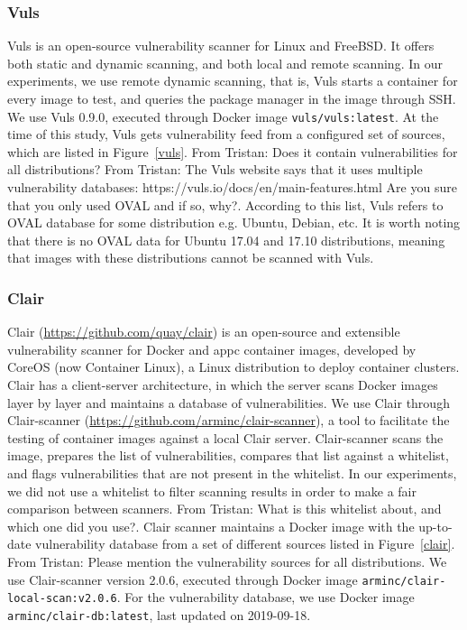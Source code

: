 \documentclass[a4paper,num-refs]{oup-contemporary}
\newcommand{\tristan}[1]{\color{blue}From Tristan: #1\color{black}}
\begin{document}
\subsubsection{Vuls}

Vuls is an open-source vulnerability scanner for Linux and FreeBSD. It
offers both static and dynamic scanning, and both local and remote
scanning. In our experiments, we use remote dynamic scanning, that is, Vuls
starts a container for every image to test, and queries the package manager
in the image through SSH. We use Vuls 0.9.0, executed through Docker image
\texttt{vuls/vuls:latest}. At the time of this study, Vuls gets vulnerability feed
from a configured set of sources, which are listed in Figure~\ref{vuls}.
\tristan{Does it contain
vulnerabilities for all distributions?} 
\tristan{The Vuls website says that it uses multiple vulnerability databases: https://vuls.io/docs/en/main-features.html Are you sure 
that you only used OVAL and if so, why?}. According to this list, Vuls
refers to OVAL database for some distribution e.g. Ubuntu, Debian, etc.
It is worth noting that there is
no OVAL data for Ubuntu 17.04 and 17.10 distributions, meaning that images
with these distributions cannot be scanned with Vuls.

\subsubsection{Clair}

Clair (\url{https://github.com/quay/clair}) is an open-source and extensible
vulnerability scanner for Docker and appc container images, developed by
CoreOS (now Container Linux), a Linux distribution to deploy container
clusters. Clair has a client-server architecture, in which the server
scans Docker images layer by layer and maintains a database of vulnerabilities. We use Clair through Clair-scanner
(\url{https://github.com/arminc/clair-scanner}), a tool to facilitate the testing
of container images against a local Clair server. Clair-scanner scans the image,
prepares the list of vulnerabilities, compares that list against a
whitelist, and flags vulnerabilities that are not present in the whitelist.
In our experiments, we did not use a whitelist to filter scanning results in
order to make a fair comparison between scanners.
\tristan{What is this whitelist about, and which one did you use?}. Clair
scanner maintains a Docker image with the up-to-date vulnerability
database from a set of different sources listed in Figure~\ref{clair}.  \tristan{Please mention the vulnerability sources for all distributions}.
 We use Clair-scanner version 2.0.6, executed through
Docker image \texttt{arminc/clair-local-scan:v2.0.6}. For the vulnerability
database, we use Docker image \texttt{arminc/clair-db:latest}, last
updated on 2019-09-18.
\end{document}
